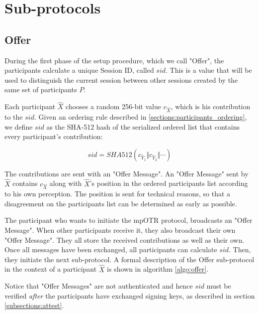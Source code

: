 \section{Sub-protocols}

\subsection{Offer}
\label{subsections:offer}
During the first phase of the setup procedure, which we call "Offer", the participants calculate a unique Session ID, called $sid$. This is a value that will be used to distinguish the current session between other sessions created by the same set of participants $P$.

Each participant $\hat{X}$ chooses a random 256-bit value $c_{\hat{X}}$, which is his contribution to the $sid$. Given an ordering rule described in \ref{sections:participants_ordering}, we define $sid$ as the SHA-512 hash of the serialized ordered list that contains every participant's contribution:

\[
  sid = SHA512(c_{\hat{Y}_1} \Vert c_{\hat{Y}_2} \Vert \cdots)
\]

The contributions are sent with an "Offer Message". An "Offer Message" sent by $\hat{X}$ contains $c_{\hat{X}}$ along with $\hat{X}$'s position in the ordered participants list according to his own perception. The position is sent for technical reasons, so that a disagreement on the participants list can be determined as early as possible.

The participant who wants to initiate the mpOTR protocol, broadcasts an "Offer Message". When other participants receive it, they also broadcast their own "Offer Message". They all store the received contributions as well as their own. Once all messages have been exchanged, all participants can calculate $sid$. Then, they initiate the next sub-protocol. A formal description of the Offer sub-protocol in the context of a participant $\hat{X}$ is shown in algorithm \ref{algo:offer}.

Notice that "Offer Messages" are not authenticated and hence $sid$ must be verified \emph{after} the participants have exchanged signing keys, as described in section \ref{subsections:attest}.

